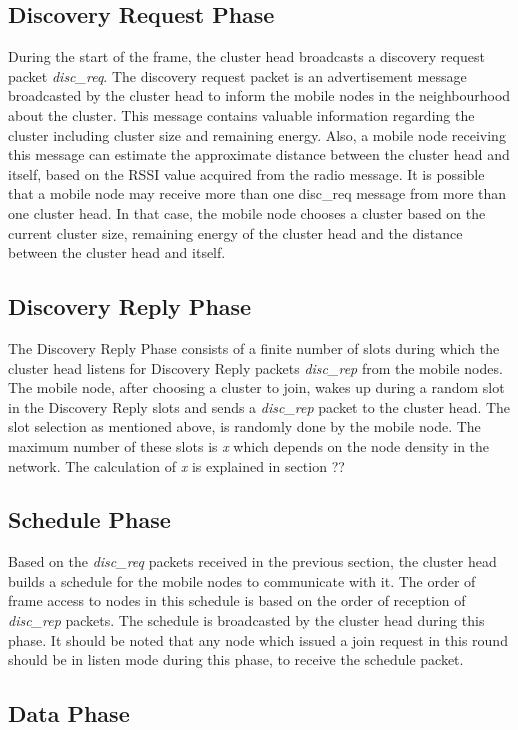 \documentclass[a4paper, conference, 10pt]{IEEEtran}
\begin{document}
\subsection{Discovery Request Phase}
During the start of the frame, the cluster head broadcasts a discovery request packet \emph{disc\_req}. The discovery request packet is an advertisement message broadcasted by the cluster head to inform the mobile nodes in the neighbourhood about the cluster. This message contains valuable information regarding the cluster including cluster size and remaining energy. Also, a mobile node receiving this message can estimate the approximate distance between the cluster head and itself, based on the RSSI value acquired from the radio message. It is possible that a mobile node may receive more than one disc\_req message from more than one cluster head. In that case, the mobile node chooses a cluster based on the current cluster size, remaining energy of the cluster head and the distance between the cluster head and itself. 

\subsection{Discovery Reply Phase}
The Discovery Reply Phase consists of a finite number of slots during which the cluster head listens for Discovery Reply packets \emph{disc\_rep} from the mobile nodes. The mobile node, after choosing a cluster to join, wakes up during a random slot in the Discovery Reply slots and sends a \emph{disc\_rep} packet to the cluster head. The slot selection as mentioned above, is randomly done by the mobile node. The maximum number of these slots is \emph{x} which depends on the node density in the network. The calculation of \emph{x} is explained in section ??

\subsection{Schedule Phase}
Based on the \emph{disc\_req} packets received in the previous section, the cluster head builds a schedule for the mobile nodes to communicate with it. The order of frame access to nodes in this schedule is based on the order of reception of \emph{disc\_rep} packets. The schedule is broadcasted by the cluster head during this phase. It should be noted that any node which issued a join request in this round should be in listen mode during this phase, to receive the schedule packet. 

\subsection{Data Phase}
\end{document}
